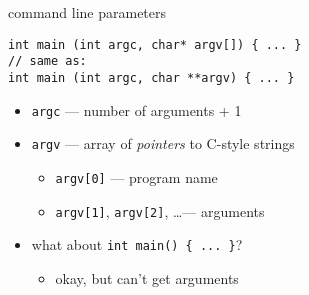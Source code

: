 \begin{frame}[fragile,label=cmdLineP]{command line parameters }
\lstset{
    language=C++,
    style=small
}
\begin{lstlisting}
int main (int argc, char* argv[]) { ... }
// same as:
int main (int argc, char **argv) { ... }
\end{lstlisting}
\begin{itemize}
\item \texttt{argc} --- number of arguments + 1
\item \texttt{argv} --- array of \textit{pointers} to C-style strings
    \begin{itemize}
    \item \texttt{argv[0]} --- program name
    \item \texttt{argv[1]}, \texttt{argv[2]}, \ldots --- arguments
    \end{itemize}
\vspace{.5cm}
\item what about \lstinline|int main() { ... }|?
    \begin{itemize}
    \item okay, but can't get arguments
    \end{itemize}
\end{itemize}
\end{frame}

